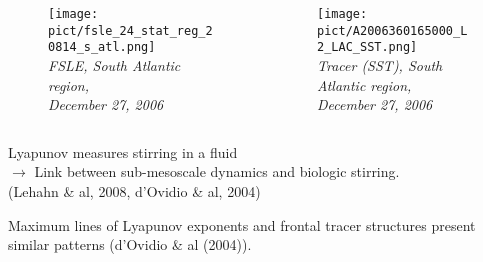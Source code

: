 \documentclass[compress,slidescentered,notes=show]{beamer}
\newcommand{\legende}[1]{\textit{\footnotesize #1}}
\begin{document}
\begin{frame}
  \begin{columns}
    \begin{column}{0.5\textwidth}
      \begin{figure}%
        \texttt{[image: pict/fsle\_24\_stat\_reg\_20814\_s\_atl.png]}\\
        \legende{FSLE, South Atlantic region, \\December 27, 2006}
      \end{figure}
    \end{column}
    \begin{column}{0.5\textwidth}
      \begin{figure}
        \texttt{[image: pict/A2006360165000\_L2\_LAC\_SST.png]}\\
        \legende{Tracer (SST), South Atlantic region, \\December 27, 2006}
      \end{figure}
    \end{column}
  \end{columns}
  \vspace{0.5cm}
  \begin{block}{}
  Lyapunov measures stirring in a fluid \\
  $\rightarrow$ Link between sub-mesoscale dynamics and biologic stirring. \\
  (Lehahn \& al, 2008, d'Ovidio \& al, 2004)
  \end{block}
  Maximum lines of Lyapunov exponents and frontal tracer structures present similar patterns (d'Ovidio \& al (2004)).

\end{frame}
\end{document}
